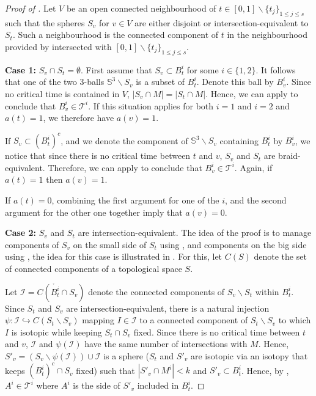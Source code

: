 \documentclass[10pt,a4paper]{amsart}
\newcommand{\Sp}{\mathbb{S}}
\newcommand{\T}{\mathcal{T}}
\begin{document}
\begin{proof}[Proof of ]
Let $V$ be an open connected neighbourhood of $t\in [0,1] \smallsetminus \{t_j\}_{1\leq j \leq s}$ such that the spheres $S_v$ for $v \in V$ are either disjoint or intersection-equivalent to $S_t$. Such a neighbourhood is the connected component of $t$ in the neighbourhood provided by  intersected with $[0,1] \smallsetminus \{t_j\}_{1\leq j \leq s}$.

\medskip

\noindent
{\bf Case 1:} $S_v \cap S_t = \emptyset$. First assume that $S_v \subset B_t^i$ for some $i \in \{1,2\}$. It follows that one of the two $3$-balls $\Sp^3 \smallsetminus S_v$ is a subset of $B^i_t$. Denote this ball by $B^i_v$. Since no critical time is contained in $V$, $|S_v \cap M| = |S_t \cap M|$. Hence, we can apply  to conclude that $B^i_v \in \T^i$. If this situation applies for both $i=1$ and $i=2$ and $a(t)=1$, we therefore have $a(v) = 1$.

If $S_v \subset (B_t^i)^{c}$, and we denote the component of $\Sp^3 \smallsetminus S_v$ containing $B^i_t$ by $B^i_v$, we notice that since there is no critical time between $t$ and $v$, $S_v$ and $S_t$ are braid-equivalent. Therefore, we can apply  to conclude that $B_v^i \in \T^i$. Again, if $a(t) = 1$ then $a(v) = 1$. 

If $a(t) = 0$, combining the first argument for one of the $i$, and the second argument for the other one together imply that $a(v) = 0$.

\medskip

\noindent
{\bf Case 2:} $S_v$ and $S_t$ are intersection-equivalent. The idea of the proof is to manage components of $S_v$ on the small side of $S_t$ using , and components on the big side using , the idea for this case is illustrated in . For this, let $C(S)$ denote the set of connected components of a topological space $S$.

Let $\mathcal{I} = C( \mathring{B^i_t} \cap S_v)$ denote the connected components of $S_v \smallsetminus S_t$ within $B^i_t$. Since $S_t$ and $S_v$ are intersection-equivalent, there is a natural injection $\psi : \mathcal{I} \hookrightarrow C (S_t \smallsetminus S_v)$ mapping $I \in \mathcal{I}$ to a connected component of $S_t \smallsetminus S_v$ to which $I$ is isotopic while keeping $S_t \cap S_v$ fixed. 
Since there is no critical time between $t$ and $v$, $\mathcal{I}$ and $\psi (\mathcal{I})$ have the same number of intersections with $M$. Hence, $S'_v = (S_v \smallsetminus \psi(\mathcal{I})) \cup \mathcal{I}$ is a sphere ($S_t$ and $S'_v$ are isotopic via an isotopy that keeps $(B^i_t)^c \cap S_v$ fixed) such that $|S'_v \cap M^i| < k$ and $S'_v \subset B^i_t$. Hence, by , $A^i \in \T^i$ where $A^i$ is the side of $S'_v$ included in $B^i_t$.


\end{proof}
\end{document}
